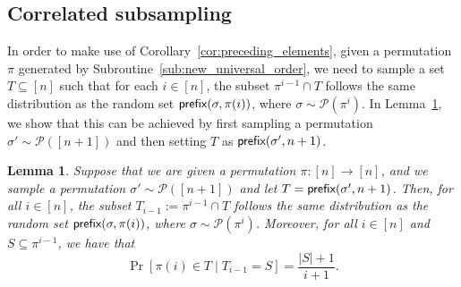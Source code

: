 \documentclass[11pt]{article}
\newcommand{\cP}{\mathcal P}
\newcommand{\pref}{\textnormal{\sffamily prefix}}
\newtheorem{lemma}[theorem]{Lemma}
\begin{document}
\subsection{Correlated subsampling}
In order to make use of Corollary~\ref{cor:preceding_elements}, given a permutation $\pi$ generated by Subroutine~\ref{sub:new_universal_order}, we need to sample a set $T\subseteq[n]$ such that for each $i\in[n]$, the subset $\pi^{i-1}\cap T$ follows the same distribution as the random set $\pref(\sigma,\pi(i))$, where $\sigma\sim\cP(\pi^{i})$. In Lemma~\ref{lem:correlated_sampling_preceding_elements}, we show that this can be achieved by first sampling a permutation $\sigma'\sim\cP([n+1])$ and then setting $T$ as $\pref(\sigma',n+1)$.
\begin{lemma}\label{lem:correlated_sampling_preceding_elements}
Suppose that we are given a permutation $\pi:[n]\to[n]$, and we sample a permutation $\sigma'\sim\cP([n+1])$ and let $T=\pref(\sigma',n+1)$. Then, for all $i\in[n]$, the subset $T_{i-1}:=\pi^{i-1}\cap T$ follows the same distribution as the random set $\pref(\sigma,\pi(i))$, where $\sigma\sim\cP(\pi^{i})$. Moreover, for all $i\in[n]$ and $S\subseteq\pi^{i-1}$, we have that
\begin{equation}\label{eq:P_pi_i_in_T}
\Pr[\pi(i)\in T\mid T_{i-1}=S]=\frac{|S|+1}{i+1}.
\end{equation}
\end{lemma}
\end{document}
